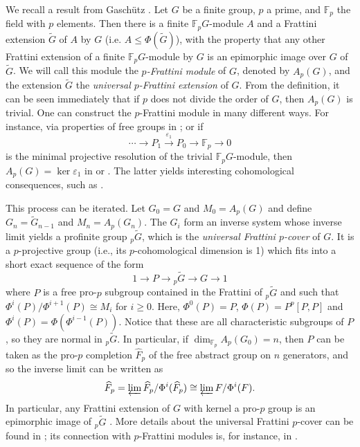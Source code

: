 \documentclass[10pt,a4paper]{amsart}
\begin{document}
We recall a result from Gasch\"{u}tz \cite{ga54}. Let $G$ be a finite group, $p$ a prime, and $\mathbb{F}_p$ the field with $p$ elements. Then there is a finite $\mathbb{F}_pG$-module $A$ and a Frattini extension $\widetilde{G}$ of $A$ by $G$ (i.e. $A\leq \Phi(\widetilde{G})$), with the property that any other Frattini extension of a finite $\mathbb{F}_pG$-module by $G$ is an epimorphic image over $G$ of $\widetilde{G}$. We will call this module the \emph{$p$-Frattini module} of $G$, denoted by $A_p(G)$, and the extension $\widetilde G$ the \emph{universal $p$-Frattini extension} of $G$. From the definition, it can be seen immediately that if $p$ does not divide the order of $G$, then $A_p(G)$ is trivial. One can construct the $p$-Frattini module in many different ways. For instance, via properties of free groups in \cite[Theorem 11.8]{DH}; or if
\[\cdots \rightarrow P_1 \xrightarrow{\varepsilon_1} P_0 \rightarrow \mathbb F_p \rightarrow 0 \]
is the minimal projective resolution of the trivial $\mathbb F_pG$-module, then $A_p(G) = \ker \varepsilon_1$ in \cite{ga54} or \cite[Theorem $\beta$.7]{DH}. The latter yields interesting cohomological consequences, such as \cite[Lemma 3]{GS78}.

This process can be iterated. Let $G_0=G$ and $M_0 = A_p(G)$ and define $G_n = \widetilde{G}_{n-1}$ and $M_n = A_p(G_n)$. The $G_i$ form an inverse system whose inverse limit yields a profinite group ${}_p \widetilde{G}$, which is the \emph{universal Frattini $p$-cover} of $G$. It is a $p$-projective group (i.e., its $p$-cohomological dimension is 1) which fits into a short exact sequence of the form
\[1 \xrightarrow{} P \to {}_p \widetilde G \rightarrow G \rightarrow 1\]
\sloppy where $P$ is a free pro-$p$ subgroup contained in the Frattini of ${}_p\widetilde G$ and such that $\Phi^i(P)/\Phi^{i+1}(P) \cong M_i$ for $i\geq 0$. Here, $\Phi^0(P) = P$, $\Phi(P) = P^p[P,P]$ and $\Phi^i(P) = \Phi(\Phi^{i-1}(P))$. Notice that these are all characteristic subgroups of $P$, so they are normal in ${}_p\widetilde G$. In particular, if $\dim_{\mathbb F_p} A_p(G_0) = n$, then $P$ can be taken as the pro-$p$ completion $\widehat {F}_p$ of the free abstract group on $n$ generators, and so the inverse limit can be written as
\[\widehat F_p = \varprojlim \widehat F_p/\Phi^i(\widehat F_p) \cong \varprojlim F/\Phi^i(F).\]
In particular, any Frattini extension of $G$ with kernel a pro-$p$ group is an epimorphic image of ${}_p \widetilde G$ \cite[Proposition 25.7.1, Corollary 25.12.2]{FJ}. More details about the universal Frattini $p$-cover can be found in \cite[Section 25.12]{FJ}; its connection with $p$-Frattini modules is, for instance, in \cite[$\S$3]{semmen}.
\end{document}
